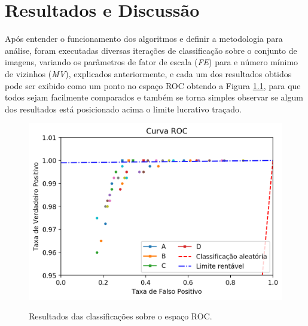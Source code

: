 \chapter{Resultados e Discussão}\label{cap:resultados}

Após entender o funcionamento dos algoritmos e definir a metodologia para análise, foram executadas diversas iterações de classificação sobre o conjunto de imagens, variando os parâmetros de fator de escala (\textit{FE}) para e número mínimo de vizinhos (\textit{MV}), explicados anteriormente, e cada um dos resultados obtidos pode ser exibido como um ponto no espaço ROC obtendo a Figura \ref{fig:results_roc}, para que todos sejam facilmente comparados e também se torna simples observar se algum dos resultados está posicionado acima o limite lucrativo traçado.

\begin{figure}[htbp]
    \centering
    \caption{Resultados das classificações sobre o espaço ROC.}
    \includegraphics[scale=1]{figs/curva_roc_results.png}
    \label{fig:results_roc}
\end{figure}

